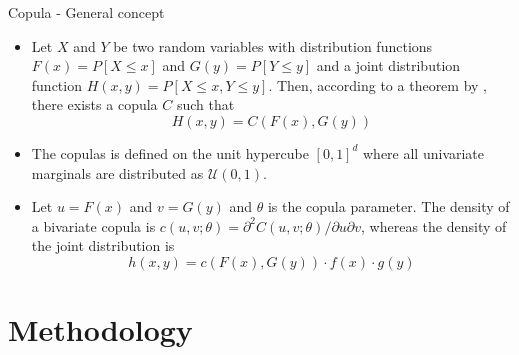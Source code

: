 \documentclass[9pt,xcolor=x11names,compress]{beamer}
\let\oldcite=\cite
\renewcommand{\cite}[1]{\textcolor{dblue}{\oldcite{#1}}}
\begin{document}
\begin{frame}{Copula - General concept}
	\begin{itemize}
		\item Let $X$ and $Y$ be two random variables with distribution functions $F(x)=P[X\leq x]$ and $G(y)=P[Y\leq y]$ and a joint distribution function $H(x,y)=P[X\leq x, Y\leq y]$. Then, according to a theorem by \cite{Sklar1959}, there exists a copula $C$ such that 
		\begin{equation}
		H(x,y) = C(F(x),G(y))
		\end{equation}   
		\item The copulas is defined on the unit hypercube $[0,1]^d$ where all univariate marginals are distributed as $\mathcal{U}(0,1)$.
		\item Let $u=F(x)$ and $v=G(y)$ and $\theta$ is the copula parameter. The density of a bivariate copula is $c(u,v;\theta)=\partial^2 C(u,v;\theta)/\partial u \partial v$, whereas the density of the joint distribution is 
		\begin{equation}
		h(x,y)=c(F(x),G(y))\cdot f(x)\cdot g(y)
		\end{equation}
	\end{itemize}
\end{frame}


\section{Methodology}
\end{document}
